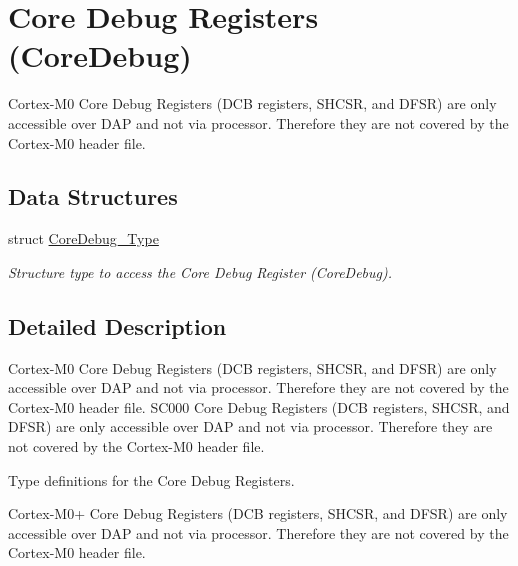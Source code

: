 \hypertarget{group___c_m_s_i_s___core_debug}{\section{Core Debug Registers (Core\-Debug)}
\label{group___c_m_s_i_s___core_debug}
}


Cortex-\/\-M0 Core Debug Registers (D\-C\-B registers, S\-H\-C\-S\-R, and D\-F\-S\-R) are only accessible over D\-A\-P and not via processor. Therefore they are not covered by the Cortex-\/\-M0 header file.  


\subsection*{Data Structures}
\begin{DoxyCompactItemize}
\item 
struct \hyperlink{struct_core_debug___type}{Core\-Debug\-\_\-\-Type}
\begin{DoxyCompactList}\small\item\em Structure type to access the Core Debug Register (Core\-Debug). \end{DoxyCompactList}\end{DoxyCompactItemize}


\subsection{Detailed Description}
Cortex-\/\-M0 Core Debug Registers (D\-C\-B registers, S\-H\-C\-S\-R, and D\-F\-S\-R) are only accessible over D\-A\-P and not via processor. Therefore they are not covered by the Cortex-\/\-M0 header file. S\-C000 Core Debug Registers (D\-C\-B registers, S\-H\-C\-S\-R, and D\-F\-S\-R) are only accessible over D\-A\-P and not via processor. Therefore they are not covered by the Cortex-\/\-M0 header file.

Type definitions for the Core Debug Registers.

Cortex-\/\-M0+ Core Debug Registers (D\-C\-B registers, S\-H\-C\-S\-R, and D\-F\-S\-R) are only accessible over D\-A\-P and not via processor. Therefore they are not covered by the Cortex-\/\-M0 header file.